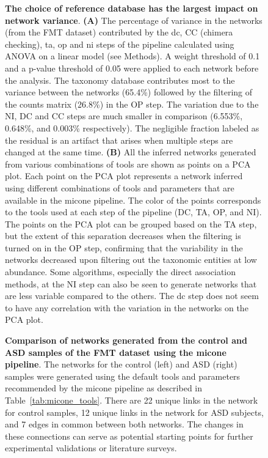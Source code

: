   \begin{figure}[H]
    \centering
      \caption{
      \textbf{The choice of reference database has the largest impact on network variance}.
      \textbf{(A)} The percentage of variance in the networks (from the  FMT dataset) contributed by the \acf{dc}, CC (chimera checking), \acf{ta}, \acf{op} and \acf{ni} steps of the pipeline calculated using ANOVA on a linear model (see Methods).
      A weight threshold of 0.1 and a p-value threshold of 0.05 were applied to each network before the analysis.
      The taxonomy database contributes most to the variance between the networks (65.4\%) followed by the filtering of the counts matrix (26.8\%) in the OP step.
    The variation due to the NI, DC and CC steps are much smaller in comparison (6.553\%, 0.648\%, and 0.003\% respectively).
      The negligible fraction labeled as the residual is an artifact that arises when multiple steps are changed at the same time.
      \textbf{(B)} All the inferred networks generated from various combinations of tools are shown as points on a PCA plot.
      Each point on the PCA plot represents a network inferred using different combinations of tools and parameters that are available in the \ac{micone} pipeline.
      The color of the points corresponds to the tools used at each step of the pipeline (DC, TA, OP, and NI).
      The points on the PCA plot can be grouped based on the TA step, but the extent of this separation decreases when the filtering is turned on in the OP step, confirming that the variability in the networks decreased upon filtering out the taxonomic entities at low abundance.
      Some algorithms, especially the direct association methods, at the NI step can also be seen to generate networks that are less variable compared to the others.
      The \ac{dc} step does not seem to have any correlation with the variation in the networks on the PCA plot.
    }
    \label{fig:figure6}
  \end{figure}


  \begin{figure}[H]
    \centering
    \caption{
      \textbf{Comparison of networks generated from the control and ASD samples of the FMT dataset using the \ac{micone} pipeline}.
      The networks for the control (left) and ASD (right) samples were generated using the default tools and parameters recommended by the \ac{micone} pipeline as described in Table~\ref{tab:micone_tools}.
      There are 22 unique links in the network for control samples, 12 unique links in the network for ASD subjects, and 7 edges in common between both networks.
      The changes in these connections can serve as potential starting points for further experimental validations or literature surveys.
    }
    \label{fig:figure7}
  \end{figure}


